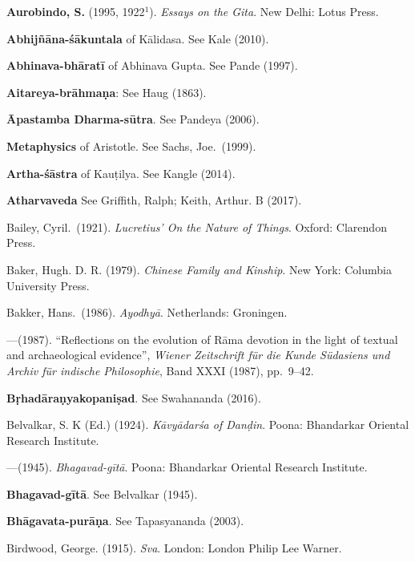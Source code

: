 \begin{thebibliography}{99}
\label{bibliography}
\itemsep=2pt
{\bf Aurobindo, S.} (1995, 1922$^{1}$). {\sl Essays on the Gita}. New Delhi: Lotus Press. 

{\bf Abhijñāna-śākuntala} of Kālidasa. See Kale (2010). 

{\bf Abhinava-bhāratī} of Abhinava Gupta. See Pande (1997).

{\bf Aitareya-brāhmaṇa}: See Haug (1863).

{\bf Āpastamba Dharma-sūtra}. See Pandeya (2006).

{\bf Metaphysics} of Aristotle. See Sachs, Joe.\ (1999).

{\bf Artha-śāstra} of Kauṭilya. See Kangle (2014).  

{\bf Atharvaveda} See Griffith, Ralph; Keith, Arthur. B (2017).

Bailey, Cyril.\ (1921). {\sl Lucretius’ On the Nature of Things}. Oxford: Clarendon Press. 

Baker, Hugh. D. R. (1979). {\sl Chinese Family and Kinship}. New York: Columbia University Press. 

Bakker, Hans.\ (1986). {\sl Ayodhyā}. Netherlands: Groningen. 

---\kern3pt(1987). “Reflections on the evolution of Rāma devotion in the light of textual and archaeological evidence”, {\sl Wiener Zeitschrift für die Kunde Südasiens und Archiv für indische Philosophie}, Band XXXI (1987), pp.~9--42. 

{\bf Bṛhadāraṇyakopaniṣad}. See Swahananda (2016).

Belvalkar, S. K (Ed.) (1924). {\sl Kāvyādarśa of Danḍin}.  Poona: Bhandarkar Oriental Research Institute. 

---\kern3pt(1945). {\sl Bhagavad-gītā}. Poona: Bhandarkar Oriental Research Institute. 

{\bf Bhagavad-gītā}. See Belvalkar (1945).

{\bf Bhāgavata-purāṇa}. See Tapasyananda (2003). 

Birdwood, George. (1915). {\sl Sva}. London: London Philip Lee Warner. 


\end{thebibliography}
